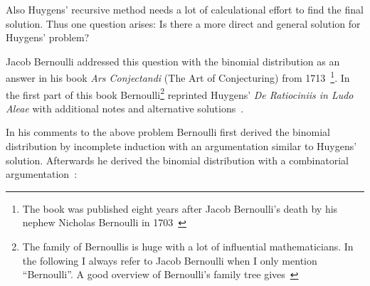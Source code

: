 Also Huygens' recursive method needs a lot of calculational effort to find the final solution. Thus one question arises: Is there a more direct and general solution for Huygens' problem?


Jacob Bernoulli addressed this question with the binomial distribution as an answer in his book \emph{Ars Conjectandi} (The Art of Conjecturing) from 1713~\cite[pp. 220-256]{hald1}\footnote{The book was published eight years after Jacob Bernoulli's death by his nephew Nicholas Bernoulli in 1703~\cite[pp. 223-224]{hald1}}. In the first part of this book Bernoulli\footnote{The family of Bernoullis is huge with a lot of influential mathematicians. In the following I always refer to Jacob Bernoulli when I only mention ``Bernoulli''. A good overview of Bernoulli's family tree gives~\cite[pp. 1-4]{bernoulli}} reprinted Huygens' \emph{De Ratiociniis in Ludo Aleae} with additional notes and alternative solutions~\cite[p. 63]{bernoulli}.

In his comments to the above problem Bernoulli first derived the binomial distribution by incomplete induction with an argumentation similar to Huygens' solution. Afterwards he derived the binomial distribution with a combinatorial argumentation~\cite[pp. 165-167]{bernoulli}:

